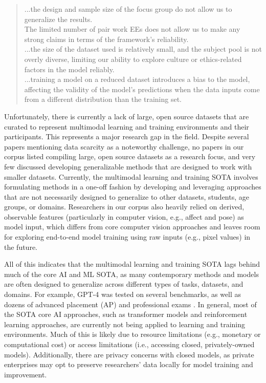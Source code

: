 \documentclass[manuscript,screen,review]{acmart}
\begin{document}
\begin{quote}
    ...the design and sample size of the focus group do not allow us to generalize the results. \cite{2609260641}\\
    
    The limited number of pair work EEs does not allow us to make any strong claims in terms of the framework’s reliability. \cite{2155422499}\\
    
    ...the size of the dataset used is relatively small, and the subject pool is not overly diverse, limiting our ability to explore culture or ethics-related factors in the model reliably. \cite{1426267857}\\
    
    ...training a model on a reduced dataset introduces a bias to the model, affecting the validity of the model’s predictions when the data inputs come from a different distribution than the training set. \cite{32184286}
\end{quote}
     
Unfortunately, there is currently a lack of large, open source datasets that are curated to represent multimodal learning and training environments and their participants. This represents a major research gap in the field. Despite several papers mentioning data scarcity as a noteworthy challenge, no papers in our corpus listed compiling large, open source datasets as a research focus, and very few discussed developing generalizable methods that are designed to work with smaller datasets. Currently, the multimodal learning and training SOTA involves formulating methods in a one-off fashion by developing and leveraging approaches that are not necessarily designed to generalize to other datasets, students, age groups, or domains. Researchers in our corpus also heavily relied on derived, observable features (particularly in computer vision, e.g., affect and pose) as model input, which differs from core computer vision approaches and leaves room for exploring end-to-end model training using raw inputs (e.g., pixel values) in the future.  

All of this indicates that the multimodal learning and training SOTA lags behind much of the core AI and ML SOTA, as many contemporary methods and models are often designed to generalize across different types of tasks, datasets, and domains. For example, GPT-4 was tested on several benchmarks, as well as dozens of advanced placement (AP) and professional exams \cite{openai2023gpt4}. In general, most of the SOTA core AI approaches, such as transformer models and reinforcement learning approaches, are currently not being applied to learning and training environments. Much of this is likely due to resource limitations (e.g., monetary or computational cost) or access limitations (i.e., accessing closed, privately-owned models). Additionally, there are privacy concerns with closed models, as private enterprises may opt to preserve researchers' data locally for model training and improvement. 
\end{document}
